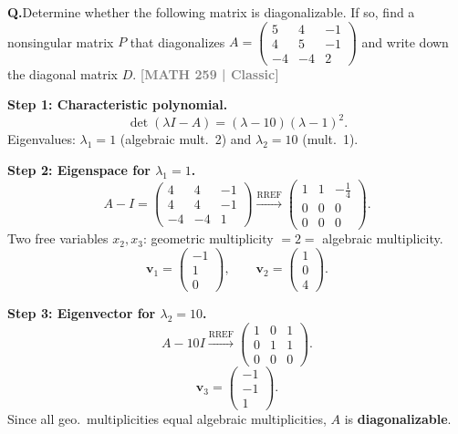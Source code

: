 \documentclass[12pt,a3paper]{article}
\newcommand{\yr}[1]{\hfill\textcolor{gray}{\small\textbf{[#1]}}}
\newcounter{qnum}
\newcommand{\Q}[1]{%
  \needspace{4\baselineskip}
  \refstepcounter{qnum}
  \vspace{6pt}
  \noindent\textbf{Q\theqnum.}\enspace #1\par
}
\begin{document}
\Q{Determine whether the following matrix is diagonalizable. If so, find a nonsingular matrix $P$ that diagonalizes $A = \begin{pmatrix} 5 & 4 & -1 \\ 4 & 5 & -1 \\ -4 & -4 & 2 \end{pmatrix}$ and write down the diagonal matrix $D$.
\yr{MATH 259 | Classic}}


\begin{tcolorbox}[enhanced,breakable,
  colback=cE!4,colframe=cE,boxrule=0.8pt,arc=5pt,
  title={\textbf{Answer --- Diagonalizability of
    $A=\begin{pmatrix}5&4&-1\\4&5&-1\\-4&-4&2\end{pmatrix}$}},
  fonttitle=\bfseries\color{white},colbacktitle=cE]

\textbf{Step 1: Characteristic polynomial.}
\[
  \det(\lambda I-A) = (\lambda-10)(\lambda-1)^2.
\]
Eigenvalues: $\lambda_1=1$ (algebraic mult.\ 2) and $\lambda_2=10$ (mult.\ 1).

\textbf{Step 2: Eigenspace for $\lambda_1=1$.}
\[
  A-I=\begin{pmatrix}4&4&-1\\4&4&-1\\-4&-4&1\end{pmatrix}
  \xrightarrow{\text{RREF}}
  \begin{pmatrix}1&1&-\frac{1}{4}\\0&0&0\\0&0&0\end{pmatrix}.
\]
Two free variables $x_2,x_3$: geometric multiplicity $=2=$ algebraic multiplicity.
\[
  \mathbf{v}_1=\begin{pmatrix}-1\\1\\0\end{pmatrix},\qquad
  \mathbf{v}_2=\begin{pmatrix}1\\0\\4\end{pmatrix}.
\]

\textbf{Step 3: Eigenvector for $\lambda_2=10$.}
\[
  A-10I\xrightarrow{\text{RREF}}
  \begin{pmatrix}1&0&1\\0&1&1\\0&0&0\end{pmatrix}.
\]
\[
  \mathbf{v}_3=\begin{pmatrix}-1\\-1\\1\end{pmatrix}.
\]
Since all geo.\ multiplicities equal algebraic multiplicities, $A$ is
\textbf{diagonalizable}.


\end{tcolorbox}
\end{document}
